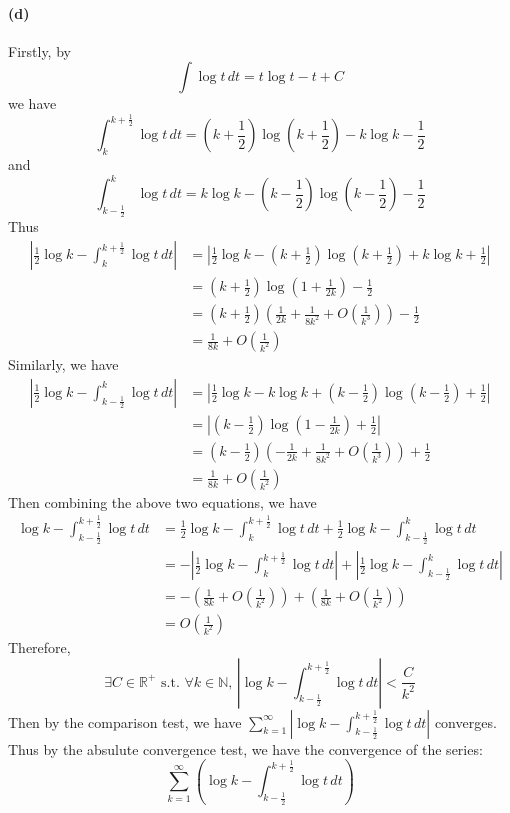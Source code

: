\documentclass{article}
\begin{document}
\paragraph[short]{(d)}
{
  Firstly, by 
  $$\int \log t \, dt=t\log t-t+C$$
  we have
  $$\int_{k}^{k+\frac{1}{2}}\log t \, dt =
    \left(k+\frac{1}{2}\right)\log\left(k+\frac{1}{2}\right)-k\log k-\frac{1}{2}$$
and
$$\int_{k-\frac{1}{2}}^{k}\log t \, dt =
    k\log k-\left(k-\frac{1}{2}\right)\log\left(k-\frac{1}{2}\right)-\frac{1}{2}$$
Thus   
\begin{align*}
    \left|\frac{1}{2}\log k-\int_{k}^{k+\frac{1}{2}}\log t \, dt\right|&=\left|\frac{1}{2}\log k-\left(k+\frac{1}{2}\right)\log\left(k+\frac{1}{2}\right)+k\log k+\frac{1}{2}\right|\\
    &=\left(k+\frac{1}{2}\right)\log\left(1+\frac{1}{2k}\right)-\frac{1}{2}\\
    &=\left(k+\frac{1}{2}\right)\left(\frac{1}{2k}+\frac{1}{8k^2}+O\left(\frac{1}{k^3}\right)\right)-\frac{1}{2}\\
    &=\frac{1}{8k}+O\left(\frac{1}{k^2}\right)
\end{align*}
Similarly, we have
\begin{align*}
    \left|\frac{1}{2}\log k-\int_{k-\frac{1}{2}}^{k}\log t \, dt\right|&=\left|\frac{1}{2}\log k-k\log k+\left(k-\frac{1}{2}\right)\log\left(k-\frac{1}{2}\right)+\frac{1}{2}\right|\\
    &=\left| \left(k-\frac{1}{2}\right)\log\left(1-\frac{1}{2k}\right) + \frac{1}{2} \right| \\
    &=\left(k-\frac{1}{2}\right)\left(-\frac{1}{2k}+\frac{1}{8k^2}+O\left(\frac{1}{k^3}\right)\right)+\frac{1}{2}\\
    &=\frac{1}{8k}+O\left(\frac{1}{k^2}\right)
\end{align*}
Then combining the above two equations, we have
\begin{align*}
    \log k-\int_{k-\frac{1}{2}}^{k+\frac{1}{2}}\log t \, dt&= \frac{1}{2}\log k-\int_{k}^{k+\frac{1}{2}}\log t \, dt+\frac{1}{2}\log k-\int_{k-\frac{1}{2}}^{k}\log t \, dt\\
    &=-\left|\frac{1}{2}\log k-\int_{k}^{k+\frac{1}{2}}\log t \, dt\right|+\left|\frac{1}{2}\log k-\int_{k-\frac{1}{2}}^{k}\log t \, dt\right|\\
    &=-\left(\frac{1}{8k}+O\left(\frac{1}{k^2}\right)\right) + \left(\frac{1}{8k}+O\left(\frac{1}{k^2}\right)\right)\\
    &=O\left(\frac{1}{k^2}\right)
\end{align*}
Therefore,
$$\exists C\in\mathbb{R^+} \text{ s.t. } \forall k\in\mathbb{N} ,\, \left|\log k-\int_{k-\frac{1}{2}}^{k+\frac{1}{2}}\log t \, dt \right| < \frac{C}{k^2}$$
Then by the comparison test, we have $\sum_{k=1}^{\infty}\left|\log k-\int_{k-\frac{1}{2}}^{k+\frac{1}{2}}\log t \, dt \right|$ converges.
\\
Thus by the absulute convergence test, we have the convergence of the series:
$$\sum_{k=1}^{\infty}\left(\log k-\int_{k-\frac{1}{2}}^{k+\frac{1}{2}}\log t \, dt \right)$$
}
\end{document}
